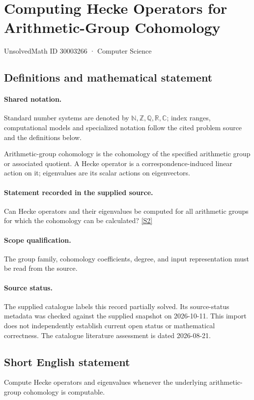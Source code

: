 \documentclass[11pt]{article}
\newcommand{\sref}[2]{\hyperlink{source:#1:#2}{[S#2]}}
\begin{document}
\setcounter{section}{30003265}
\section{Computing Hecke Operators for Arithmetic-Group Cohomology}\label{30003266}
{\small\sffamily UnsolvedMath ID 30003266 · Computer Science}
\subsection{Definitions and mathematical statement}

\paragraph{Shared notation.}Standard number systems are denoted by $\mathbb N,\mathbb Z,\mathbb Q,\mathbb R,\mathbb C$; index ranges, computational models and specialized notation follow the cited problem source and the definitions below.


Arithmetic-group cohomology is the cohomology of the specified arithmetic group or associated quotient. A Hecke operator is a correspondence-induced linear action on it; eigenvalues are its scalar actions on eigenvectors.
\paragraph{Statement recorded in the supplied source.}
Can Hecke operators and their eigenvalues be computed for all arithmetic groups for which the cohomology can be calculated? \sref{30003266}{2}
\paragraph{Scope qualification.}
The group family, cohomology coefficients, degree, and input representation must be read from the source.
\paragraph{Source status.}
The supplied catalogue labels this record partially solved. Its source-status metadata was checked against the supplied snapshot on 2026-10-11. This import does not independently establish current open status or mathematical correctness. The catalogue literature assessment is dated 2026-08-21.
\subsection{Short English statement}
Compute Hecke operators and eigenvalues whenever the underlying arithmetic-group cohomology is computable.
\end{document}
